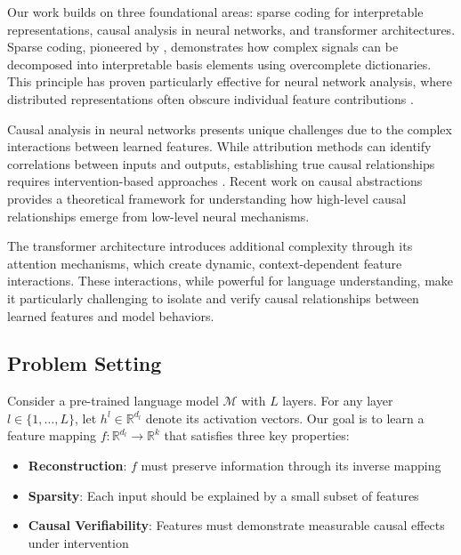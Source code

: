 \documentclass{article} %
\begin{document}
Our work builds on three foundational areas: sparse coding for interpretable representations, causal analysis in neural networks, and transformer architectures. Sparse coding, pioneered by \cite{Olshausen1996EmergenceOS}, demonstrates how complex signals can be decomposed into interpretable basis elements using overcomplete dictionaries. This principle has proven particularly effective for neural network analysis, where distributed representations often obscure individual feature contributions \cite{Cunningham2023SparseAF}.

Causal analysis in neural networks presents unique challenges due to the complex interactions between learned features. While attribution methods \cite{Sundararajan2017AxiomaticAF} can identify correlations between inputs and outputs, establishing true causal relationships requires intervention-based approaches \cite{Li2016UnderstandingNN}. Recent work on causal abstractions \cite{Geiger2021CausalAO} provides a theoretical framework for understanding how high-level causal relationships emerge from low-level neural mechanisms.

The transformer architecture \cite{vaswani2017attention} introduces additional complexity through its attention mechanisms, which create dynamic, context-dependent feature interactions. These interactions, while powerful for language understanding, make it particularly challenging to isolate and verify causal relationships between learned features and model behaviors.

\subsection{Problem Setting}
\label{subsec:problem}

Consider a pre-trained language model $\mathcal{M}$ with $L$ layers. For any layer $l \in \{1,\ldots,L\}$, let $h^l \in \mathbb{R}^{d_l}$ denote its activation vectors. Our goal is to learn a feature mapping $f: \mathbb{R}^{d_l} \rightarrow \mathbb{R}^k$ that satisfies three key properties:

\begin{itemize}
    \item \textbf{Reconstruction}: $f$ must preserve information through its inverse mapping
    \item \textbf{Sparsity}: Each input should be explained by a small subset of features
    \item \textbf{Causal Verifiability}: Features must demonstrate measurable causal effects under intervention
\end{itemize}
\end{document}
